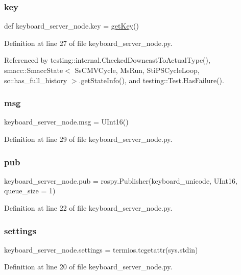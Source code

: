 \subsubsection{\texorpdfstring{key}{key}}
{\footnotesize\ttfamily def keyboard\+\_\+server\+\_\+node.\+key = \hyperlink{namespacekeyboard__server__node_abe4dc127c8bdf79333dfa931e556f6f7}{get\+Key}()}



Definition at line 27 of file keyboard\+\_\+server\+\_\+node.\+py.



Referenced by testing\+::internal.\+Checked\+Downcast\+To\+Actual\+Type(), smacc\+::\+Smacc\+State$<$ Ss\+C\+M\+V\+Cycle, Ms\+Run, Sti\+P\+S\+Cycle\+Loop, sc\+::has\+\_\+full\+\_\+history $>$.\+get\+State\+Info(), and testing\+::\+Test.\+Has\+Failure().

\mbox{\label{namespacekeyboard__server__node_a555024e72f3e57503b0eebad2546fc72}} 
\subsubsection{\texorpdfstring{msg}{msg}}
{\footnotesize\ttfamily keyboard\+\_\+server\+\_\+node.\+msg = U\+Int16()}



Definition at line 29 of file keyboard\+\_\+server\+\_\+node.\+py.

\mbox{\label{namespacekeyboard__server__node_acb9a153a1e2ddb5dab254f49ade8512e}} 
\subsubsection{\texorpdfstring{pub}{pub}}
{\footnotesize\ttfamily keyboard\+\_\+server\+\_\+node.\+pub = rospy.\+Publisher(\textquotesingle{}keyboard\+\_\+unicode\textquotesingle{}, U\+Int16, queue\+\_\+size = 1)}



Definition at line 22 of file keyboard\+\_\+server\+\_\+node.\+py.

\mbox{\label{namespacekeyboard__server__node_ade1a45e58d917f8cdb07d1d54ac6bd34}} 
\subsubsection{\texorpdfstring{settings}{settings}}
{\footnotesize\ttfamily keyboard\+\_\+server\+\_\+node.\+settings = termios.\+tcgetattr(sys.\+stdin)}



Definition at line 20 of file keyboard\+\_\+server\+\_\+node.\+py.

